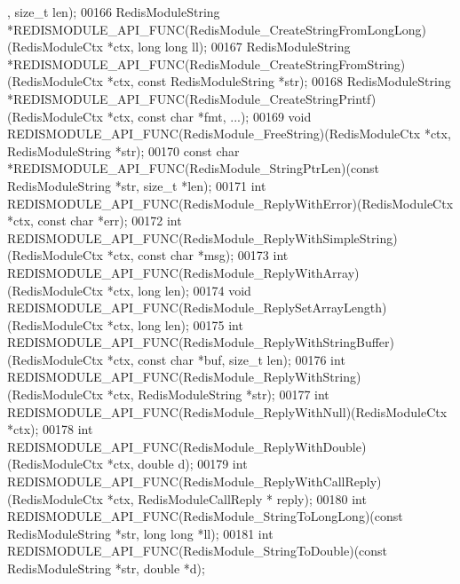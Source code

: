 \begin{DoxyCode}
      , size\_t len);
00166 RedisModuleString *REDISMODULE\_API\_FUNC(RedisModule\_CreateStringFromLongLong)(RedisModuleCtx *ctx, \textcolor{keywordtype}{
      long} \textcolor{keywordtype}{long} ll);
00167 RedisModuleString *REDISMODULE\_API\_FUNC(RedisModule\_CreateStringFromString)(RedisModuleCtx *ctx, \textcolor{keyword}{const}
       RedisModuleString *str);
00168 RedisModuleString *REDISMODULE\_API\_FUNC(RedisModule\_CreateStringPrintf)(RedisModuleCtx *ctx, \textcolor{keyword}{const} \textcolor{keywordtype}{
      char} *fmt, ...);
00169 \textcolor{keywordtype}{void} REDISMODULE\_API\_FUNC(RedisModule\_FreeString)(RedisModuleCtx *ctx, RedisModuleString *str);
00170 \textcolor{keyword}{const} \textcolor{keywordtype}{char} *REDISMODULE\_API\_FUNC(RedisModule\_StringPtrLen)(\textcolor{keyword}{const} RedisModuleString *str, size\_t *len);
00171 \textcolor{keywordtype}{int} REDISMODULE\_API\_FUNC(RedisModule\_ReplyWithError)(RedisModuleCtx *ctx, \textcolor{keyword}{const} \textcolor{keywordtype}{char} *err);
00172 \textcolor{keywordtype}{int} REDISMODULE\_API\_FUNC(RedisModule\_ReplyWithSimpleString)(RedisModuleCtx *ctx, \textcolor{keyword}{const} \textcolor{keywordtype}{char} *msg);
00173 \textcolor{keywordtype}{int} REDISMODULE\_API\_FUNC(RedisModule\_ReplyWithArray)(RedisModuleCtx *ctx, \textcolor{keywordtype}{long} len);
00174 \textcolor{keywordtype}{void} REDISMODULE\_API\_FUNC(RedisModule\_ReplySetArrayLength)(RedisModuleCtx *ctx, \textcolor{keywordtype}{long} len);
00175 \textcolor{keywordtype}{int} REDISMODULE\_API\_FUNC(RedisModule\_ReplyWithStringBuffer)(RedisModuleCtx *ctx, \textcolor{keyword}{const} \textcolor{keywordtype}{char} *buf, 
      size\_t len);
00176 \textcolor{keywordtype}{int} REDISMODULE\_API\_FUNC(RedisModule\_ReplyWithString)(RedisModuleCtx *ctx, RedisModuleString *str);
00177 \textcolor{keywordtype}{int} REDISMODULE\_API\_FUNC(RedisModule\_ReplyWithNull)(RedisModuleCtx *ctx);
00178 \textcolor{keywordtype}{int} REDISMODULE\_API\_FUNC(RedisModule\_ReplyWithDouble)(RedisModuleCtx *ctx, \textcolor{keywordtype}{double} d);
00179 \textcolor{keywordtype}{int} REDISMODULE\_API\_FUNC(RedisModule\_ReplyWithCallReply)(RedisModuleCtx *ctx, RedisModuleCallReply *
      reply);
00180 \textcolor{keywordtype}{int} REDISMODULE\_API\_FUNC(RedisModule\_StringToLongLong)(\textcolor{keyword}{const} RedisModuleString *str, \textcolor{keywordtype}{long} \textcolor{keywordtype}{long} *ll);
00181 \textcolor{keywordtype}{int} REDISMODULE\_API\_FUNC(RedisModule\_StringToDouble)(\textcolor{keyword}{const} RedisModuleString *str, \textcolor{keywordtype}{double} *d);

\end{DoxyCode}
